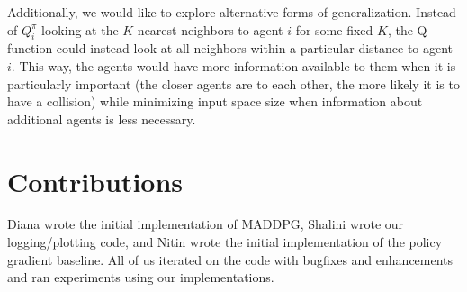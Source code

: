 \documentclass{article}
\begin{document}
Additionally, we would like to explore alternative forms of generalization. Instead of $Q^\pi_i$ looking at the $K$ nearest neighbors to agent $i$ for some fixed $K$, the Q-function could instead look at all neighbors within a particular distance to agent $i$. This way, the agents would have more information available to them when it is particularly important (the closer agents are to each other, the more likely it is to have a collision) while minimizing input space size when information about additional agents is less necessary.

\section*{Contributions}
Diana wrote the initial implementation of MADDPG, Shalini wrote our logging/plotting code, and Nitin wrote the initial implementation of the policy gradient baseline. All of us iterated on the code with bugfixes and enhancements and ran experiments using our implementations.



\end{document}
